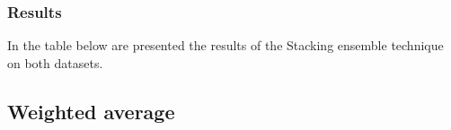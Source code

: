 \subsubsection{Results}
In the table below are presented the results of the Stacking ensemble technique on both datasets.
\begin{table}[h]
    \centering
    \caption{Performance metrics Stacking ensemble}
    \label{tab: stacking performance}
\end{table}

\subsection{Weighted average}

